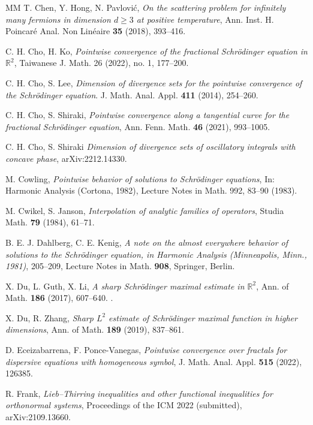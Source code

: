 \documentclass[a4paper]{amsart}
\numberwithin{equation}{section}%
\theoremstyle{plain}%
\theoremstyle{definition}
\theoremstyle{remark}%
\begin{document}
\begin{thebibliography}{MM}
 T. Chen, Y. Hong, N. Pavlovi\'{c}, \textit{On the scattering problem for infinitely many fermions in dimension $d\geq3$ at positive temperature}, Ann. Inst. H. Poincar\'e Anal. Non Lin\'eaire \textbf{35} (2018), 393--416.

C. H. Cho,
H. Ko,
\textit{Pointwise convergence of the fractional Schr\"odinger equation in $\mathbb R^2$}, Taiwanese J. Math. 26 (2022), no. 1, 177--200.

C. H. Cho, S. Lee, \textit{Dimension of divergence sets for the pointwise convergence of the Schr\"odinger equation}. J. Math. Anal. Appl. \textbf{411} (2014), 254--260.

 C. H. Cho, S. Shiraki, \textit{Pointwise convergence along a tangential curve for the fractional {S}chr\"{o}dinger equation}, Ann. Fenn. Math. \textbf{46} (2021), 993--1005.

C. H. Cho, S. Shiraki
\textit{Dimension of divergence sets of oscillatory integrals with concave phase},
arXiv:2212.14330.

M. Cowling, \textit{Pointwise behavior of solutions to Schr\"odinger equations}, In: Harmonic Analysis (Cortona, 1982), Lecture Notes in Math. 992, 83--90 (1983).



 M. Cwikel, S. Janson, \textit{Interpolation of analytic families of operators}, Studia Math. \textbf{79} (1984), 61--71.

 B. E. J. Dahlberg, C. E. Kenig, \textit{A note on the almost everywhere behavior of solutions to the Schr\"{o}dinger equation, in Harmonic Analysis (Minneapolis, Minn., 1981)}, 205--209, Lecture Notes in Math. \textbf{908}, Springer, Berlin.

 X. Du, L. Guth, X. Li, \textit{A sharp Schr\"{o}dinger maximal estimate in $\mathbb{R}^2$}, Ann. of Math. \textbf{186} (2017), 607--640.
.

 X. Du, R. Zhang, \textit{Sharp $L^2$ estimate of Schr\"{o}dinger maximal function in higher dimensions}, Ann. of Math. \textbf{189} (2019), 837--861.


D. Eceizabarrena, F. Ponce-Vanegas,
\textit{Pointwise convergence over fractals for dispersive equations with homogeneous symbol},
J. Math. Anal. Appl.
\textbf{515}
(2022),
126385.


 R. Frank, \textit{Lieb--Thirring inequalities and other functional inequalities for orthonormal systems}, Proceedings of the ICM 2022 (submitted), arXiv:2109.13660.


\end{thebibliography}
\end{document}
